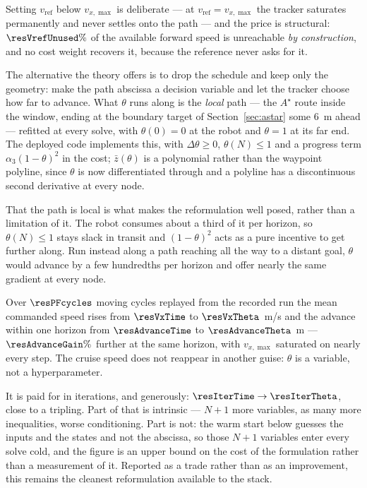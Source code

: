 \documentclass[11pt,a4paper]{article}
\newcommand{\astar}{$A^\star$}
\begin{document}
Setting $v_{\mathrm{ref}}$ below $v_{x,\max}$ is deliberate --- at $v_{\mathrm{ref}}=v_{x,\max}$ the tracker
saturates permanently and never settles onto the path --- and the price is structural: $\resVrefUnused\%$ of
the available forward speed is unreachable \emph{by construction}, and no cost weight recovers it, because
the reference never asks for it.

The alternative the theory offers is to drop the schedule and keep only the geometry: make the path abscissa
a decision variable and let the tracker choose how far to advance. What $\theta$ runs along is the
\emph{local} path --- the \astar{} route inside the window, ending at the boundary target of
Section~\ref{sec:astar} some $6$~m ahead --- refitted at every solve, with $\theta(0)=0$ at the robot and
$\theta=1$ at its far end. The deployed code implements this, with $\Delta\theta\ge0$, $\theta(N)\le1$ and a
progress term $\alpha_3(1-\theta)^2$ in the cost; $\bar z(\theta)$ is a polynomial rather than the
waypoint polyline, since $\theta$ is now differentiated through and a polyline has a discontinuous second
derivative at every node.

That the path is local is what makes the reformulation well posed, rather than a limitation of it. The robot
consumes about a third of it per horizon, so $\theta(N)\le1$ stays slack in transit and $(1-\theta)^2$ acts
as a pure incentive to get further along. Run instead along a path reaching all the way to a distant goal,
$\theta$ would advance by a few hundredths per horizon and offer nearly the same gradient at every node.

\begin{table}[htbp]
  \centering
  \small
  \caption{%
  Time-parametrised against path-parametrised reference, averaged over $\resPFcycles$ cycles replayed from
  the recorded run \resBag.}
  \label{res:tab:pf}
\end{table}

Over $\resPFcycles$ moving cycles replayed from the recorded run the mean commanded speed rises from
$\resVxTime$ to $\resVxTheta$~m/s and the advance within one horizon from $\resAdvanceTime$ to
$\resAdvanceTheta$~m --- $\resAdvanceGain\%$ further at the same horizon, with $v_{x,\max}$ saturated on
nearly every step. The cruise speed does not reappear in another guise: $\theta$ is a variable, not a
hyperparameter.

It is paid for in iterations, and generously: $\resIterTime\to\resIterTheta$, close to a tripling. Part
of that is intrinsic --- $N+1$ more variables, as many more inequalities, worse conditioning. Part is not:
the warm start below guesses the inputs and the states and not the abscissa, so those $N+1$ variables enter
every solve cold, and the figure is an upper bound on the cost of the formulation rather than a measurement
of it. Reported as a trade rather than as an improvement, this remains the cleanest reformulation available
to the stack.
\end{document}
